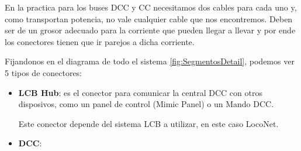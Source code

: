 En la practica para los buses DCC y CC necesitamos dos cables para cada uno y, como transportan potencia, no vale cualquier cable que nos encontremos. Deben ser de un grosor adecuado para la corriente que pueden llegar a llevar y por ende los conectores tienen que ir parejos a dicha corriente. 

Fijandonos en el diagrama de todo el sistema \ref{fig:SegmentosDetail}, podemos ver 5 tipos de conectores:
\begin{itemize}
	\item \textbf{LCB Hub}: es el conector para comunicar la central DCC con otros disposivos, como un panel de control (Mimic Panel) o un Mando DCC.

	Este conector depende del sistema LCB a utilizar, en este caso LocoNet.
	\item \textbf{DCC}: 

\end{itemize}
